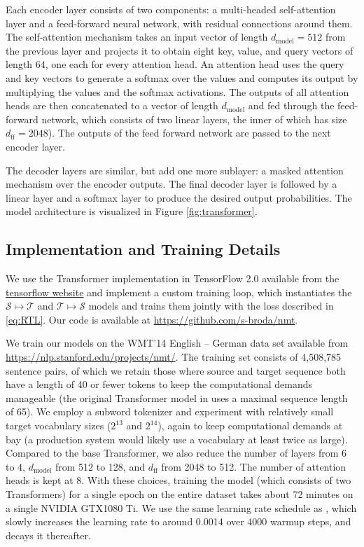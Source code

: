 \documentclass[11pt,a4paper]{article}
\begin{document}
Each encoder layer consists of two components: a multi-headed self-attention layer and a feed-forward neural network, with residual connections around them. The self-attention mechanism takes an input vector of length $d_{\text{model}} = 512$ from the previous layer and projects it to obtain eight key, value, and query vectors of length $64$, one each for every attention head. An attention head uses the query and key vectors to generate a softmax over the values and computes its output by multiplying the values and the softmax activations. The outputs of all attention heads are then concatenated to a vector of length $d_{\text{model}}$ and fed through the feed-forward network, which consists of two linear layers, the inner of which has size $d_{\text{ff}} = 2048$). The outputs of the feed forward network are passed to the next encoder layer.


The decoder layers are similar, but add one more sublayer: a masked attention mechanism over the encoder outputs. The final decoder layer is followed by a linear layer and a softmax layer to produce the desired output probabilities. The model architecture is visualized in Figure \ref{fig:transformer}.

\subsection{Implementation and Training Details}
We use the Transformer implementation in TensorFlow 2.0 available from the \href{https://www.tensorflow.org/tutorials/text/transformer}{tensorflow website} and implement a custom training loop, which instantiates the $\mathcal{S}\mapsto\mathcal{T}$ and $\mathcal{T}\mapsto\mathcal{S}$ models and trains them jointly with the loss described in \eqref{eq:RTL}. Our code is available at \href{https://github.com/s-broda/nmt}{https://github.com/s-broda/nmt}. 

We train our models on the WMT'14 English -- German data set available from \linebreak\href{https://nlp.stanford.edu/projects/nmt/}{https://nlp.stanford.edu/projects/nmt/}. The training set consists of 4,508,785 sentence pairs, of which we retain those where source and target sequence both have a length of 40 or fewer tokens to keep the computational demands manageable (the original Transformer model in \citet{transformer} uses a maximal sequence length of 65). We employ a subword tokenizer and experiment with relatively small target vocabulary sizes ($2^{13}$ and $2^{14}$), again to keep computational demands at bay (a production system would likely use a vocabulary at least twice as large). Compared to the base Transformer, we also reduce the number of layers from 6 to 4, $d_{\text{model}}$ from 512 to 128, and $d_{\text{ff}}$ from 2048 to 512. The number of attention heads is kept at 8.
With these choices, training the model (which consists of two Transformers) for a single epoch on the entire dataset takes about 72 minutes on a single NVIDIA GTX1080 Ti. We use the same learning rate schedule as \cite{transformer}, which slowly increases the learning rate to around 0.0014 over 4000 warmup steps, and decays it thereafter.
\end{document}
